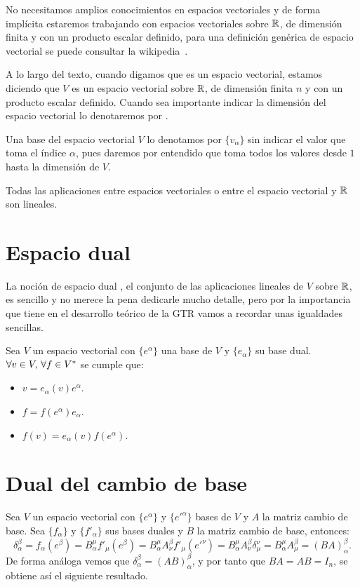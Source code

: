 \begin{summary}
No necesitamos amplios conocimientos en espacios vectoriales y de forma implícita estaremos trabajando con espacios
vectoriales sobre $\mathbb{R}$, de dimensión finita y con un producto escalar definido, para una definición genérica de
espacio vectorial se puede consultar la wikipedia~\cite{wiki:espacio-vectorial}.

A lo largo del texto, cuando digamos que  es un espacio
vectorial, estamos diciendo que $V$ es un espacio vectorial sobre $\mathbb{R}$, de dimensión finita $n$ y con un producto
escalar definido.
Cuando sea importante indicar la dimensión del espacio vectorial lo denotaremos por
.

Una base del espacio vectorial $V$ lo denotamos por $\{v_\alpha\}$ sin indicar el valor que toma el índice $\alpha$,
pues daremos por entendido que toma todos los valores desde $1$ hasta la dimensión de $V$.

Todas las aplicaciones entre espacios vectoriales o entre el espacio vectorial y $\mathbb{R}$ son lineales.
\end{summary}

\section{Espacio dual}\label{sec:espacio-dual}
La noción de espacio dual \cite{wiki:espacio-dual}, el conjunto de las aplicaciones lineales de $V$ sobre $\mathbb{R}$, es
sencillo y no merece la pena dedicarle mucho detalle, pero por la importancia que tiene en el desarrollo teórico de
la GTR vamos a recordar unas igualdades sencillas.

\begin{result}
  \label{res:coordenadas_duales}
  Sea $V$ un espacio vectorial con $\{e^\alpha\}$ una base de $V$ y $\{e_\alpha\}$ su base dual.
  $\forall v\in V,\thinspace \forall f\in V^*$ se cumple que:
  \begin{itemize}
    \item $v=e_\alpha(v)e^\alpha$.
    \item $f=f(e^\alpha)e_\alpha$.
    \item $f(v)=e_\alpha(v)f(e^\alpha)$.
  \end{itemize}
\end{result}

\section{Dual del cambio de base}\label{sec:dual-del-cambio-de-base}
Sea $V$ un espacio vectorial con $\{e^\alpha\}$ y $\{e'^\alpha\}$ bases de $V$ y $A$ la matriz cambio de base.
Sea $\{f_\alpha\}$ y $\{f'_\alpha\}$ sus bases duales y $B$ la matriz cambio de base, entonces:
\[
  \delta_\alpha^\beta=f_\alpha(e^\beta)=B_\alpha^\mu f'_\mu(e^\beta)=B_\alpha^\mu A^\beta_\nu f'_\mu(e'^\nu)=B_\alpha^\mu A^\beta_\nu\delta^\nu_\mu=B_\alpha^\mu A^\beta_\mu=(BA)^\beta_\alpha.
\]
De forma análoga vemos que $\delta^\beta_\alpha=(AB)^\beta_\alpha$, y por tanto que $BA=AB=I_n$, se obtiene así el
siguiente resultado.

